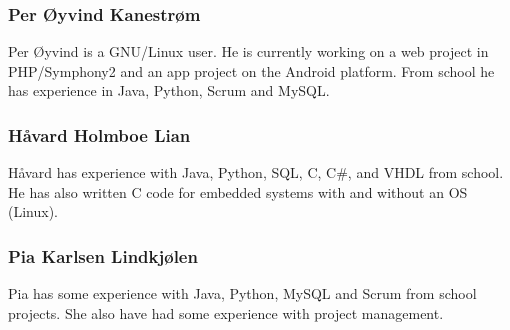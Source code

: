 \subsubsection{Per Øyvind Kanestrøm}
Per Øyvind is a GNU/Linux user. He is currently working on a web project in PHP/Symphony2 and an app project on the Android platform. From school he has experience in Java, Python, Scrum and MySQL.

\subsubsection{Håvard Holmboe Lian}
Håvard has experience with Java, Python, SQL, C, C\#, and VHDL from school. He has also written C code for embedded systems with and without an OS (Linux). 

\subsubsection{Pia	Karlsen	Lindkjølen}
Pia has some experience with Java, Python, MySQL and Scrum from school projects. She also have had some experience with project management. 